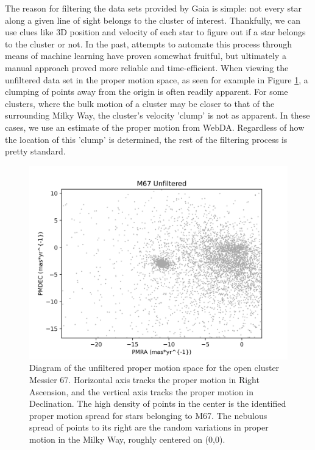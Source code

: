 \documentclass[onecolumn,table,xcdraw,super]{aastex631}
\begin{document}
The reason for filtering the data sets provided by Gaia is simple: not every star along a given line of sight belongs to the cluster of interest. Thankfully, we can use clues like 3D position and velocity of each star to figure out if a star belongs to the cluster or not. In the past, attempts to automate this process through means of machine learning have proven somewhat fruitful, but ultimately a manual approach proved more reliable and time-efficient. When viewing the unfiltered data set in the proper motion space, as seen for example in Figure \ref{fig:M67_pm_unfiltered}, a clumping of points away from the origin is often readily apparent. For some clusters, where the bulk motion of a cluster may be closer to that of the surrounding Milky Way, the cluster's velocity 'clump' is not as apparent. In these cases, we use an estimate of the proper motion from WebDA. Regardless of how the location of this 'clump' is determined, the rest of the filtering process is pretty standard.

\begin{figure}[]
	\centering
      \includegraphics[width=4.75in]{figures/M67_pm_unfiltered.png}
	\caption{Diagram of the unfiltered proper motion space for the open cluster Messier 67. Horizontal axis tracks the proper motion in Right Ascension, and the vertical axis tracks the proper motion in Declination. The high density of points in the center is the identified proper motion spread for stars belonging to M67. The nebulous spread of points to its right are the random variations in proper motion in the Milky Way, roughly centered on (0,0).}
	\label{fig:M67_pm_unfiltered}
\end{figure}
\end{document}
